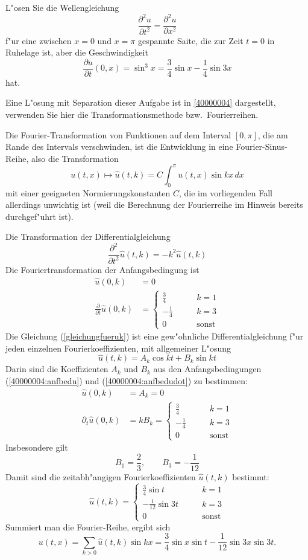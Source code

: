 L"osen Sie die Wellengleichung
\[
\frac{\partial^2 u}{\partial t^2}=\frac{\partial^2 u}{\partial x^2}
\]
f"ur eine zwischen $x=0$ und $x=\pi$ gespannte Saite,
die zur Zeit $t=0$ in Ruhelage ist, aber die Geschwindigkeit
\[
\frac{\partial u}{\partial t}(0, x)
=
\sin^3 x=\frac34\sin x-\frac14\sin 3x
\]
hat.

\begin{hinweis}
Eine L"osung mit Separation dieser Aufgabe ist in \ref{40000004}
dargestellt, verwenden Sie hier die Transformationsmethode bzw.~Fourierreihen.
\end{hinweis}

\begin{loesung}
Die Fourier-Transformation
von Funktionen auf dem Interval $[0,\pi]$, die am Rande
des Intervals verschwinden, ist die Entwicklung in eine Fourier-Sinus-Reihe,
also die Transformation 
\[u(t,x) \mapsto \hat u(t, k)= C\int_0^{\pi} u(t,x)\sin kx\, dx\]
mit einer geeigneten Normierungskonstanten $C$, die im vorliegenden
Fall allerdings unwichtig ist (weil die Berechnung der Fourierreihe
im Hinweis bereits durchgef"uhrt ist).

Die Transformation der Differentialgleichung 
\begin{equation}
\frac{\partial^2}{\partial t^2}\hat u(t,k)
=-k^2\hat u(t,k)
\label{gleichungfueruk}
\end{equation}
Die Fouriertransformation der Anfangsbedingung ist
\begin{align}
\hat u(0,k)&=0\label{40000004:anfbedu}\\
\frac{\partial}{\partial t}\hat u(0,k)&=
\begin{cases}
\frac34&\qquad k= 1\\
-\frac14&\qquad k= 3\\
0&\qquad \text{sonst}
\end{cases}
\label{40000004:anfbedudot}
\end{align}
Die Gleichung
(\ref{gleichungfueruk})
ist eine gew"ohnliche Differentialgleichung f"ur jeden
einzelnen Fourierkoeffizienten, mit allgemeiner L"osung
\[
\hat u(t,k)=A_k\cos kt+B_k\sin kt
\]
Darin sind die Koeffizienten $A_k$ und $B_k$ aus den Anfangsbedingungen
(\ref{40000004:anfbedu}) und (\ref{40000004:anfbedudot}) zu bestimmen:
\begin{align*}
\hat u(0,k)&=A_k=0\\
\partial_t \hat u(0,k)&=kB_k=
\begin{cases}
\frac34&\qquad k= 1\\
-\frac14&\qquad k= 3\\
0&\qquad \text{sonst}
\end{cases}
\end{align*}
Insbesondere gilt
\[
B_1=\frac23,\qquad B_3=-\frac1{12}
\]
Damit sind die zeitabh"angigen Fourierkoeffizienten $\hat u(t,k)$ bestimmt:
\[
\hat u(t,k)=
\begin{cases}
\frac34\sin t &\qquad k= 1\\
-\frac1{12}\sin 3t&\qquad k= 3\\
0&\qquad \text{sonst}
\end{cases}
\]
Summiert man die Fourier-Reihe, ergibt sich
\[
u(t,x)=\sum_{k>0}\hat u(t,k) \sin kx
= \frac34\sin x \sin t -\frac1{12}\sin 3x \sin 3t.
\]
\end{loesung}
